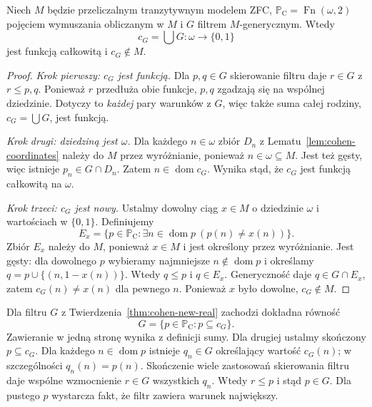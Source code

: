\begin{twierdzenie}
\label{thm:cohen-new-real}
Niech $M$ będzie przeliczalnym
tranzytywnym modelem ZFC,
$\mathbb P_{\mathrm C}=\operatorname{Fn}(\omega,2)$
pojęciem wymuszania obliczanym w $M$
i $G$ filtrem $M$-generycznym.
Wtedy
\[
 c_G=\bigcup G:\omega\longrightarrow\{0,1\}
\]
jest funkcją całkowitą i $c_G\notin M$.
\end{twierdzenie}
\begin{proof}
\emph{Krok pierwszy: $c_G$ jest funkcją.}
Dla $p,q\in G$ skierowanie filtru daje
$r\in G$ z $r\leq p,q$. Ponieważ
$r$ przedłuża obie funkcje, $p,q$
zgadzają się na wspólnej dziedzinie.
Dotyczy to \emph{każdej} pary warunków z $G$,
więc także suma całej rodziny,
$c_G=\bigcup G$, jest funkcją.

\emph{Krok drugi: dziedziną jest $\omega$.}
Dla każdego $n\in\omega$ zbiór $D_n$
z Lematu~\ref{lem:cohen-coordinates}
należy do $M$ przez wyróżnianie,
ponieważ $n\in\omega\subseteq M$.
Jest też gęsty, więc istnieje
$p_n\in G\cap D_n$. Zatem
$n\in\operatorname{dom}c_G$.
Wynika stąd, że $c_G$ jest
funkcją całkowitą na $\omega$.

\emph{Krok trzeci: $c_G$ jest nowy.}
Ustalmy dowolny ciąg $x\in M$
o dziedzinie $\omega$ i wartościach
w $\{0,1\}$. Definiujemy
\[
 E_x=\{p\in\mathbb P_{\mathrm C}:
   \exists n\in\operatorname{dom}p\
                          (p(n)\ne x(n))\}.
\]
Zbiór $E_x$ należy do $M$, ponieważ
$x\in M$ i jest określony przez wyróżnianie.
Jest gęsty: dla dowolnego $p$
wybieramy najmniejsze
$n\notin\operatorname{dom}p$ i określamy
$q=p\cup\{(n,1-x(n))\}$.
Wtedy $q\leq p$ i $q\in E_x$.
Generyczność daje $q\in G\cap E_x$,
zatem $c_G(n)\ne x(n)$ dla pewnego $n$.
Ponieważ $x$ było dowolne, $c_G\notin M$.
\end{proof}

\begin{przyklad}
\label{ex:cohen-filter-recovery}
Dla filtru $G$ z
Twierdzenia~\ref{thm:cohen-new-real}
zachodzi dokładna równość
\[
 G=\{p\in\mathbb P_{\mathrm C}:p\subseteq c_G\}.
\]
Zawieranie w jedną stronę wynika
z definicji sumy. Dla drugiej
ustalmy skończony $p\subseteq c_G$.
Dla każdego $n\in\operatorname{dom}p$
istnieje $q_n\in G$ określający
wartość $c_G(n)$; w szczególności
$q_n(n)=p(n)$. Skończenie wiele
zastosowań skierowania filtru
daje wspólne wzmocnienie
$r\in G$ wszystkich $q_n$.
Wtedy $r\leq p$ i stąd $p\in G$.
Dla pustego $p$ wystarcza fakt,
że filtr zawiera warunek największy.
\end{przyklad}

